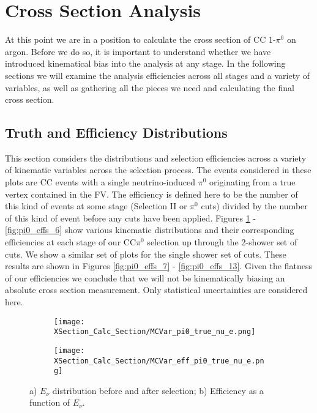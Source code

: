 \clearpage
\section{Cross Section Analysis}
\par At this point we are in a position to calculate the cross section of CC 1-$\pi^0$ on argon.  Before we do so, it is important to understand whether we have introduced kinematical bias into the analysis at any stage.  In the following sections we will examine the analysis efficiencies across all stages and a variety of variables, as well as gathering all the pieces we need and calculating the final cross section.

\subsection{Truth and Efficiency Distributions}
This section considers the distributions and selection efficiencies across a variety of kinematic variables across the selection process.  The events considered in these plots are CC events with a single neutrino-induced $\pi^0$ originating from a true vertex contained in the FV. The efficiency is defined here to be the number of this kind of events at some stage (Selection II or $\pi^0$ cuts) divided by the number of this kind of event before any cuts have been applied.  Figures \ref{fig:pi0_effs_0} - \ref{fig:pi0_effs_6} show various kinematic distributions and their corresponding efficiencies at each stage of our CC$\pi^0$ selection up through the 2-shower set of cuts.  We show a similar set of plots for the single shower set of cuts.  These results are shown in Figures \ref{fig:pi0_effs_7} - \ref{fig:pi0_effs_13}. Given the flatness of our efficiencies we conclude that we will not be kinematically biasing an absolute cross section measurement. Only statistical uncertainties are considered here. 

\begin{figure}[h!]
\centering

 \begin{subfigure}[t]{0.39\textwidth}
    \centering
    \texttt{[image: XSection\_Calc\_Section/MCVar\_pi0\_true\_nu\_e.png]}
  \caption{ }
  \end{subfigure} 
  \hspace{20mm}
  \begin{subfigure}[t]{0.39\textwidth}
    \centering
\texttt{[image: XSection\_Calc\_Section/MCVar\_eff\_pi0\_true\_nu\_e.png]}
  \caption{ }
  \end{subfigure} 
\caption{a) $E_\nu$ distribution before and after selection; b) Efficiency as a function of $E_\nu$. }
\label{fig:pi0_effs_0}
\end{figure}

